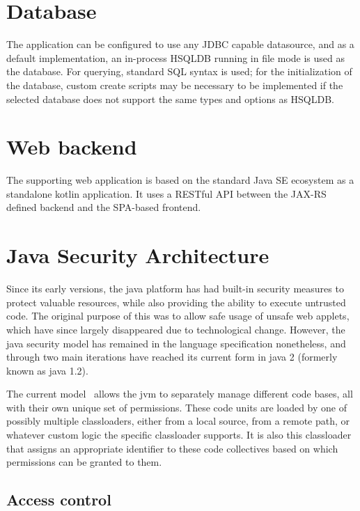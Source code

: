 	\section{Database}
 
 	The application can be configured to use any JDBC capable datasource, and as a default implementation, an in-process HSQLDB running in file mode is used as the database. For querying, standard SQL syntax is used; for the initialization of the database, custom create scripts may be necessary to be implemented if the selected database does not support the same types and options as HSQLDB.

	\section{Web backend}
	
	The supporting web application is based on the standard Java SE ecosystem as a standalone kotlin application. It uses a RESTful API between the JAX-RS defined backend and the SPA-based frontend.

	\section{Java Security Architecture}
	
	Since its early versions, the java platform has had built-in security measures to protect valuable resources, while also providing the ability to execute untrusted code. The original purpose of this was to allow safe usage of unsafe web applets, which have since largely disappeared due to technological change. However, the java security model has remained in the language specification nonetheless, and through two main iterations have reached its current form in java 2 (formerly known as java 1.2).
	
	The current model~\cite{JavaSandbox} allows the jvm to separately manage different code bases, all with their own unique set of permissions. These code units are loaded by one of possibly multiple classloaders, either from a local source, from a remote path, or whatever custom logic the specific classloader supports. It is also this classloader that assigns an appropriate identifier to these code collectives based on which permissions can be granted to them.
	
	\subsection{Access control}
	
